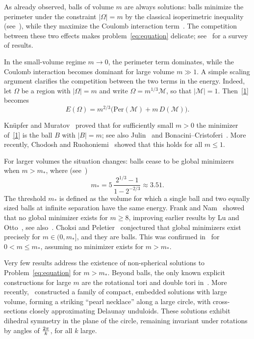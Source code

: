 \documentclass[10pt,reqno,english]{amsart}
\theoremstyle{definition}
\numberwithin{equation}{section}
\begin{document}
As already observed, balls of volume $m$ are always solutions: balls minimize the perimeter under the constraint $|\Omega|=m$ by the classical isoperimetric inequality (see~\cite[Theorem 14.1]{Maggi2012}), while they maximize the Coulomb interaction term~\cite[Theorem 3.7]{LiebLoss1997}. The competition between these two effects makes problem~\eqref{eq:equation} delicate; see~\cite{ChoksiMuratovTopaloglu2017} for a survey of results.

In the small-volume regime $m\to0$, the perimeter term dominates, while the Coulomb interaction becomes dominant for large volume $m\gg1$. A simple scaling argument clarifies the competition between the two terms in the energy.
Indeed, let $\Omega$ be a region with $|\Omega|=m$ and write $\Omega=m^{1/3}\mathcal{M}$, so that $|\mathcal{M}|=1$. Then~\eqref{1} becomes
\[
E(\Omega)=m^{2/3}\big(\mathrm{Per}(\mathcal{M})+m\,D(\mathcal{M})\big).
\]

Kn\"upfer and Muratov~\cite{KnupferMuratov2014} proved that for sufficiently small $m>0$ the minimizer of~\eqref{1} is the ball $B$ with $|B|=m$; see also Julin~\cite{Julin2014} and Bonacini–Cristoferi~\cite{BonaciniCristoferi2014}. More recently, Chodosh and Ruohoniemi~\cite{ChodoshRuohoniemi2025} showed that this holds for all $m\le1$. 

For larger volumes the situation changes: balls cease to be global minimizers when $m>m_*$, where (see~\cite{ChoksiPeletier2011,FL15})
\[
m_*=5\,\frac{2^{1/3}-1}{1-2^{-2/3}}\approx3.51.
\]
The threshold $m_*$ is defined as the volume for which a single ball and two equally sized balls at infinite separation have the same energy. 
Frank and Nam~\cite{FrankNam2021} showed that no global minimizer exists for $m\ge 8$, improving earlier results by Lu and Otto~\cite{LuOtto2014}, see also~\cite{FrankKillipNam2016}. Choksi and Peletier~\cite{ChoksiPeletier2011} conjectured that global minimizers exist precisely for $m\in(0,m_*]$, and they are balls. This was confirmed in~\cite{FrankNam2021} for $0<m\le m_*$, assuming no minimizer exists for $m>m_*$.

Very few results address the existence of non-spherical solutions to Problem~\eqref{eq:equation} for $m>m_*$. Beyond balls, the only known explicit constructions for large $m$ are the rotational tori and double tori in~\cite{RenWei1,RenWei2}.  More recently,~\cite{delPinoMussoZuniga2025} constructed a family of compact, embedded solutions with large volume, forming a striking “pearl necklace” along a large circle, with cross-sections closely approximating Delaunay unduloids. These solutions exhibit dihedral symmetry in the plane of the circle, remaining invariant under rotations by angles of ${2\pi \over k}$, for all $k$ large.
\end{document}

